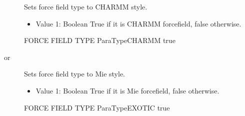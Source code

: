 \documentclass[letterpaper,10pt,english]{sphinxmanual}
\begin{document}
\begin{description}
\item[{}] \leavevmode
Sets force field type to CHARMM style.
\begin{itemize}
\item {} 
Value 1: Boolean \sphinxhyphen{} True if it is CHARMM forcefield, false otherwise.

\end{itemize}

\begin{sphinxVerbatim}[commandchars=\\\{\}]
\PYGZsh{}\PYGZsh{}\PYGZsh{}\PYGZsh{}\PYGZsh{}\PYGZsh{}\PYGZsh{}\PYGZsh{}\PYGZsh{}\PYGZsh{}\PYGZsh{}\PYGZsh{}\PYGZsh{}\PYGZsh{}\PYGZsh{}\PYGZsh{}\PYGZsh{}\PYGZsh{}\PYGZsh{}\PYGZsh{}\PYGZsh{}\PYGZsh{}\PYGZsh{}\PYGZsh{}\PYGZsh{}\PYGZsh{}\PYGZsh{}\PYGZsh{}\PYGZsh{}\PYGZsh{}\PYGZsh{}\PYGZsh{}\PYGZsh{}
\PYGZsh{} FORCE FIELD TYPE
\PYGZsh{}\PYGZsh{}\PYGZsh{}\PYGZsh{}\PYGZsh{}\PYGZsh{}\PYGZsh{}\PYGZsh{}\PYGZsh{}\PYGZsh{}\PYGZsh{}\PYGZsh{}\PYGZsh{}\PYGZsh{}\PYGZsh{}\PYGZsh{}\PYGZsh{}\PYGZsh{}\PYGZsh{}\PYGZsh{}\PYGZsh{}\PYGZsh{}\PYGZsh{}\PYGZsh{}\PYGZsh{}\PYGZsh{}\PYGZsh{}\PYGZsh{}\PYGZsh{}\PYGZsh{}\PYGZsh{}\PYGZsh{}\PYGZsh{}
ParaTypeCHARMM    true
\end{sphinxVerbatim}

\item[{ or }] \leavevmode
Sets force field type to Mie style.
\begin{itemize}
\item {} 
Value 1: Boolean \sphinxhyphen{} True if it is Mie forcefield, false otherwise.

\end{itemize}

\begin{sphinxVerbatim}[commandchars=\\\{\}]
\PYGZsh{}\PYGZsh{}\PYGZsh{}\PYGZsh{}\PYGZsh{}\PYGZsh{}\PYGZsh{}\PYGZsh{}\PYGZsh{}\PYGZsh{}\PYGZsh{}\PYGZsh{}\PYGZsh{}\PYGZsh{}\PYGZsh{}\PYGZsh{}\PYGZsh{}\PYGZsh{}\PYGZsh{}\PYGZsh{}\PYGZsh{}\PYGZsh{}\PYGZsh{}\PYGZsh{}\PYGZsh{}\PYGZsh{}\PYGZsh{}\PYGZsh{}\PYGZsh{}\PYGZsh{}\PYGZsh{}\PYGZsh{}\PYGZsh{}
\PYGZsh{} FORCE FIELD TYPE
\PYGZsh{}\PYGZsh{}\PYGZsh{}\PYGZsh{}\PYGZsh{}\PYGZsh{}\PYGZsh{}\PYGZsh{}\PYGZsh{}\PYGZsh{}\PYGZsh{}\PYGZsh{}\PYGZsh{}\PYGZsh{}\PYGZsh{}\PYGZsh{}\PYGZsh{}\PYGZsh{}\PYGZsh{}\PYGZsh{}\PYGZsh{}\PYGZsh{}\PYGZsh{}\PYGZsh{}\PYGZsh{}\PYGZsh{}\PYGZsh{}\PYGZsh{}\PYGZsh{}\PYGZsh{}\PYGZsh{}\PYGZsh{}\PYGZsh{}
ParaTypeEXOTIC    true
\end{sphinxVerbatim}


\end{description}
\end{document}
